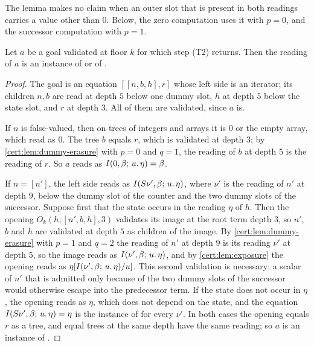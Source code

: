 The lemma makes no claim when an outer slot that is present in both readings
carries a value other than $0$. Below, the zero computation uses it with
$p=0$, and the successor computation with $p=1$.

\begin{lemma}\label{cert:lem:leaves}
Let $a$ be a goal validated at floor $k$ for which step (T2) returns. Then
the reading of $a$ is an instance of  or of .
\end{lemma}
\begin{proof}
The goal is an equation $[[n,b,h],r]$ whose left side is an iterator; its
children $n,b$ are read at depth $5$ below one dummy slot, $h$ at depth $5$
below the state slot, and $r$ at depth $3$. All of them are validated, since
$a$ is.

If $n$ is false-valued, then on trees of integers and arrays it is $0$ or the
empty array, which read as $0$. The tree $b$ equals $r$, which is validated
at depth $3$; by \cref{cert:lem:dummy-erasure} with $p=0$ and $q=1$, the
reading of $b$ at depth $5$ is the reading of $r$. So $a$ reads as
$I(0,\beta;\,u.\,\eta)=\beta$.

If $n=[n']$, the left side reads as $I(S\nu',\beta;\,u.\,\eta)$, where
$\nu'$ is the reading of $n'$ at depth $9$, below the dummy slot of the
counter and the two dummy slots of the successor. Suppose first that the
state occurs in the reading $\eta$ of $h$. Then the opening
$O_k(h;[n',b,h],3)$ validates its image at the root term depth $3$, so $n'$,
$b$ and $h$ are validated at depth $5$ as children of the image. By
\cref{cert:lem:dummy-erasure} with $p=1$ and $q=2$ the reading of $n'$ at
depth $9$ is its reading $\nu'$ at depth $5$, so the image reads as
$I(\nu',\beta;\,u.\,\eta)$, and by \cref{cert:lem:exposure} the opening reads
as $\eta[I(\nu',\beta;\,u.\,\eta)/u]$. This second validation is necessary:
a scalar of $n'$ that is admitted only because of the two dummy slots of the
successor would otherwise escape into the predecessor term. If the state does
not occur in $\eta$, the opening reads as $\eta$, which does not depend on the
state, and the equation
$I(S\nu',\beta;\,u.\,\eta)=\eta$ is the instance of  for
every $\nu'$. In both cases the opening equals $r$ as a tree, and equal
trees at the same depth have the same reading; so $a$ is an instance of
.
\end{proof}

